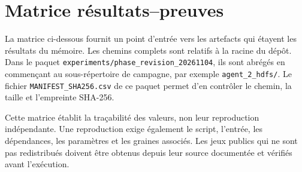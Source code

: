 
\section{Matrice résultats--preuves}

La matrice ci-dessous fournit un point d'entrée vers les artefacts qui étayent les
résultats du mémoire. Les chemins complets sont relatifs à la racine du dépôt. Dans le
paquet \texttt{experiments/phase\_revision\_20261104}, ils sont abrégés en commençant au
sous-répertoire de campagne, par exemple \texttt{agent\_2\_hdfs/}. Le fichier
\texttt{MANIFEST\_SHA256.csv} de ce paquet permet d'en contrôler le chemin, la taille et
l'empreinte SHA-256.

Cette matrice établit la traçabilité des valeurs, non leur reproduction indépendante.
Une reproduction exige également le script, l'entrée, les dépendances, les paramètres et
les graines associés. Les jeux publics qui ne sont pas redistribués doivent être obtenus
depuis leur source documentée et vérifiés avant l'exécution.
